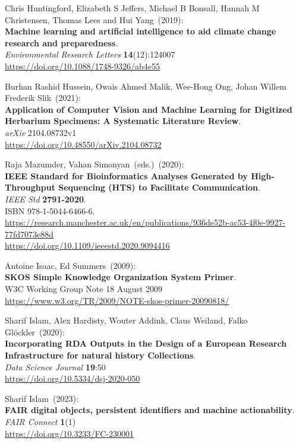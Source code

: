 \begin{thebibliography}{9}
Chris Huntingford, Elizabeth S Jeffers, Michael B Bonsall, Hannah M Christensen, Thomas Lees and Hui Yang~(2019): \\
\textbf{Machine learning and artificial intelligence to aid climate change research and preparedness}.\\
\emph{Environmental Research Letters} \textbf{14}(12):124007\\
\url{https://doi.org/10.1088/1748-9326/ab4e55}

Burhan Rashid Hussein, Owais Ahmed Malik, Wee-Hong Ong, Johan Willem Frederik Slik~(2021): \\
\textbf{Application of Computer Vision and Machine Learning for Digitized
Herbarium Specimens: A Systematic Literature Review}.\\
\emph{arXiv} 2104.08732v1\\
\url{https://doi.org/10.48550/arXiv.2104.08732}

Raja Mazumder, Vahan Simonyan~(eds.)~(2020): \\
\textbf{IEEE Standard for Bioinformatics Analyses Generated by
High-Throughput Sequencing (HTS) to Facilitate Communication}.\\
\emph{IEEE Std} \textbf{2791-2020}.\\
ISBN 978-1-5044-6466-6.\\
\url{https://research.manchester.ac.uk/en/publications/936de52b-ac53-4f0e-9927-77fd7073e88d}\\
\url{https://doi.org/10.1109/ieeestd.2020.9094416}

Antoine Isaac, Ed Summers~(2009): \\
\textbf{SKOS Simple Knowledge Organization System Primer}. \\
W3C Working Group Note 18 August 2009 \\
\url{https://www.w3.org/TR/2009/NOTE-skos-primer-20090818/}

Sharif Islam, Alex Hardisty, Wouter Addink, Claus Weiland, Falko Glöckler~(2020): \\
\textbf{Incorporating RDA Outputs in the Design of a European Research Infrastructure for natural history Collections}.\\
\emph{Data Science Journal} \textbf{19}:50\\
\url{https://doi.org/10.5334/dsj-2020-050}

Sharif Islam~(2023): \\
\textbf{FAIR digital objects, persistent identifiers and machine actionability}. \\
\emph{FAIR Connect} \textbf{1}(1) \\
\url{https://doi.org/10.3233/FC-230001}


\end{thebibliography}
